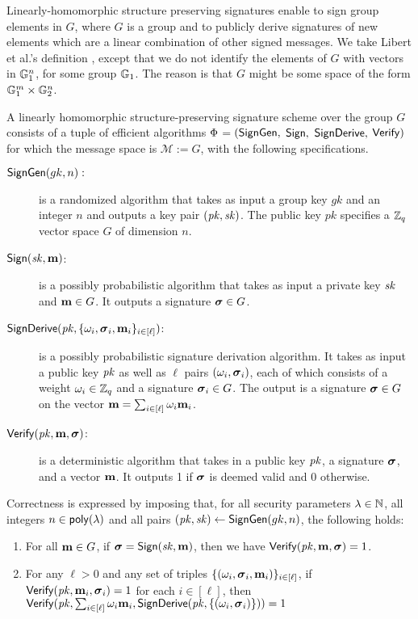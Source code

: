 \label{def:splh}
Linearly-homomorphic structure preserving signatures  \cite{C:AFGHO10,PKC:BFKW09} enable to sign group elements 
in $G$, where $G$ is a group and to publicly derive signatures of new elements which are a linear combination of other signed messages. We take Libert et al.'s definition \cite{C:LPJY13}, except that we do not identify the elements of $G$ with vectors in $\mathbb{G}_1^n$, for some group $\mathbb{G}_1$. The reason is that $G$ might be some space of the form $\mathbb{G}_1^m \times \mathbb{G}_2^n$. 

\begin{definition}
A linearly homomorphic structure-preserving signature scheme over the group $G$  consists
of a tuple of efficient algorithms $\Phi$$=$$(\mathsf{SignGen},$ $\mathsf{Sign},$ $\mathsf{SignDerive},$ $\mathsf{Verify})$ for which the message space
is $\mathcal{M} := G$, with the following specifications.

\begin{description}

\item[$\mathsf{SignGen}(gk, n):$] is a randomized algorithm that takes as input a group key $gk$ and an integer $n$ and  outputs a key pair $(\mathit{pk}, \mathit{sk})$. The public key $pk$ specifies a $\mathbb{Z}_q$ vector space $G$ of dimension $n$. 

\item[$\mathsf{Sign}(\mathit{sk},\mathbf{m})$:] is a possibly probabilistic algorithm that takes as input a private key $\mathit{sk}$
 and $\mathbf{m}\in G$. It outputs a signature ${\boldsymbol \sigma}\in G$.

\item[$\mathsf{SignDerive}(\mathit{pk},\{\omega_i,{\boldsymbol \sigma}_i,\mathbf{m}_i \}_{i\in[\ell]})$:] is a possibly probabilistic signature derivation algorithm. It
takes as input a public key $\mathit{pk}$ as well as $\ell$ pairs $(\omega_i,{\boldsymbol \sigma}_i)$, each of which
consists of a weight $\omega_i\in\mathbb{Z}_q$ and a signature ${\boldsymbol \sigma_i}\in G$. The output is a signature
${\boldsymbol \sigma}\in G$ on the vector $\mathbf{m} = \sum_{i\in[\ell]} \omega_i\mathbf{m}_i $.

\item[$\mathsf{Verify}(\mathit{pk}, \mathbf{m},  {\boldsymbol \sigma})$:] is a deterministic algorithm that takes in a public key $\mathit{pk}$,
a signature ${\boldsymbol \sigma}$, and a vector $\mathbf{m}$. It outputs 1 if ${\boldsymbol \sigma}$ is deemed valid and 0 otherwise.
\end{description}
\end{definition}

Correctness is expressed by imposing that, for all security parameters $\lambda\in\mathbb{N}$, all integers $n\in\mathsf{poly}(\lambda)$
and all pairs $(\mathit{pk},\mathit{sk}) \gets \mathsf{SignGen}(gk, n)$, the following holds:
\begin{enumerate}
\item For all $\mathbf{m} \in G$, if ${\boldsymbol \sigma} = \mathsf{Sign}(\mathit{sk}, \mathbf{m})$, then we have $\mathsf{Verify}(\mathit{pk}, \mathbf{m}, {\boldsymbol \sigma}) = 1$.
\item For any $\ell > 0$ and any set of triples $\{(\omega_i, {\boldsymbol \sigma}_i, \mathbf{m}_i)\}_{i\in[\ell]}$,
if $\mathsf{Verify}(\mathit{pk}, \mathbf{m}_i, {\boldsymbol \sigma}_i) = 1$ for each $i \in [\ell]$, then
$\mathsf{Verify}(
    \mathit{pk},
    \sum_{i\in[\ell]} \omega_i\mathbf{m}_i,
    \mathsf{SignDerive}(
        \mathit{pk},
        \{(\omega_i, {\boldsymbol \sigma}_i)\}
        )
    )=1
$
\end{enumerate}

